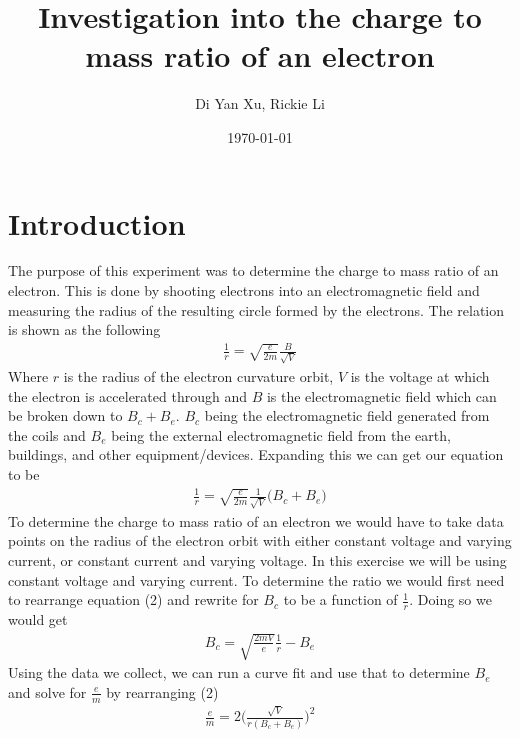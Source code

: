 \documentclass{article}
\title{Investigation into the charge to mass ratio of an electron}
\author{Di Yan Xu, Rickie Li}
\date{\today}
\begin{document}
\maketitle

\newpage

\section{Introduction}
The purpose of this experiment was to determine the charge to mass ratio of an
electron. This is done by shooting electrons into
an electromagnetic field and measuring the radius of the resulting circle
formed by the electrons. The relation is shown as the following
\begin{align}
    \frac{1}{r} = \sqrt{\frac{e}{2m}}\frac{B}{\sqrt{V}}
\end{align}
Where $r$ is the radius of the electron curvature orbit, $V$ is the voltage at
which the electron is accelerated through and $B$ is the electromagnetic field
which can be broken down to $B_c + B_e$.
$B_c$ being the electromagnetic field generated from the coils and $B_e$ being
the external electromagnetic field from the earth, buildings, and other 
equipment/devices. Expanding this we can get our equation to be
\begin{align}
    \frac{1}{r} = \sqrt{\frac{e}{2m}} \frac{1}{\sqrt{V}}\big(B_c + B_e\big)
\end{align}
To determine the charge to mass ratio of an electron we would have to take
data points on the radius of the electron orbit with either constant voltage and
varying current, or constant current and varying voltage. In this exercise we
will be using constant voltage and varying current. To determine the ratio we
would first need to rearrange equation (2) and rewrite for $B_c$ to be a function
of $\frac{1}{r}$. Doing so we would get
\begin{align}
    B_c = \sqrt{\frac{2mV}{e}}\frac{1}{r} - B_e
\end{align}
Using the data we collect, we can run a curve fit and use that to
determine $B_e$ and solve for $\frac{e}{m}$ by rearranging (2)
\begin{align}
    \frac{e}{m} = 2\Bigg(\frac{\sqrt{V}}{r(B_c + B_e)} \Bigg)^2
\end{align}

\newpage
\end{document}
